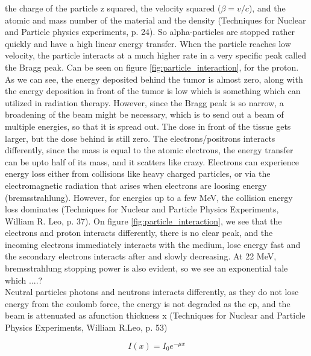 the charge of the particle z squared, the velocity squared ($\beta=v/c$), and the atomic and mass number of the material and the density (Techniques for Nuclear and Particle physics experiments, p.  24). So alpha-particles are stopped rather quickly and have a high linear energy transfer. 
When the particle reaches low velocity, the particle interacts at a much higher rate in a very specific peak called the Bragg peak. Can be seen on figure \ref{fig:particle_interaction}, for the proton. As we can see, the energy deposited behind the tumor is almost zero, along with the energy deposition in front of the tumor is low which is something which can utilized in radiation therapy. However, since the Bragg peak is so narrow, a broadening of the beam might be necessary, which is to send out a beam of multiple energies, so that it is spread out. The dose in front of the tissue gets larger, but the dose behind is still zero. The electrons/positrons interacts differently, since the mass is equal to the atomic electrons, the energy transfer can be upto half of its mass, and it scatters like crazy. Electrons can experience energy loss either from collisions like heavy charged particles, or via the electromagnetic radiation that arises when electrons are loosing energy (bremsstrahlung). However, for energies up to a few MeV, the collision energy loss dominates (Techniques for Nuclear and Particle Physics Experiments, William R. Leo, p. 37). On figure \ref{fig:particle_interaction}, we see that  the electrons and proton interacts differently, there is no clear peak, and the incoming electrons immediately interacts with the medium, lose energy fast and the secondary electrons interacts after and slowly decreasing. At 22 MeV, bremsstrahlung stopping power is also evident, so we see an exponential tale which ....? \\

Neutral particles photons and neutrons interacts differently, as they do not lose energy from the coulomb force, the energy is not degraded as the cp, and the beam is attenuated as  afunction thickness x (Techniques for Nuclear and Particle Physics Experiments, William R.Leo, p.  53)

\begin{equation}
    I(x)=I_0 e^{-\mu x}
\end{equation}


